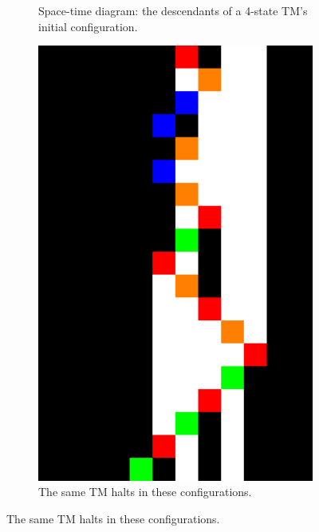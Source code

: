 \begin{figure}
\begin{subfigure}[m]{0.125\textwidth}
    \caption{Space-time diagram: the descendants of a 4-state TM's initial configuration.}
    \label{fig:far_spacetime}
  \end{subfigure}
  \hfill
  \parbox{0.2\textwidth}{
  \begin{subfigure}[t]{0.2\textwidth}
    \centering
    \includegraphics[width=\textwidth]{space-time-diagrams/finite-automata-reduction-counter4-halt.pdf}
    \caption{The same TM halts in these configurations.}
    \label{fig:far_spacetime_halt}
  \end{subfigure}
  \vspace{0.23\textheight}

}
\end{figure}
